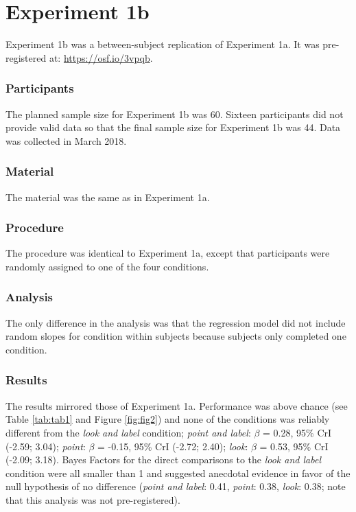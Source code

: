 \documentclass[
  man,floatsintext]{apa6}
\begin{document}
\section{Experiment 1b}\label{experiment-1b}

Experiment 1b was a between-subject replication of Experiment 1a. It was pre-registered at: \url{https://osf.io/3vpqb}.

\subsubsection{Participants}\label{participants-1}

The planned sample size for Experiment 1b was 60. Sixteen participants did not provide valid data so that the final sample size for Experiment 1b was 44. Data was collected in March 2018.

\subsubsection{Material}\label{material-1}

The material was the same as in Experiment 1a.

\subsubsection{Procedure}\label{procedure-1}

The procedure was identical to Experiment 1a, except that participants were randomly assigned to one of the four conditions.

\subsubsection{Analysis}\label{analysis-1}

The only difference in the analysis was that the regression model did not include random slopes for condition within subjects because subjects only completed one condition.

\subsubsection{Results}\label{results-1}

The results mirrored those of Experiment 1a. Performance was above chance (see Table \ref{tab:tab1} and Figure \ref{fig:fig2}) and none of the conditions was reliably different from the \emph{look and label} condition; \emph{point and label}: \(\beta\) = 0.28, 95\% CrI (-2.59; 3.04); \emph{point}: \(\beta\) = -0.15, 95\% CrI (-2.72; 2.40); \emph{look}: \(\beta\) = 0.53, 95\% CrI (-2.09; 3.18). Bayes Factors for the direct comparisons to the \emph{look and label} condition were all smaller than 1 and suggested anecdotal evidence in favor of the null hypothesis of no difference (\emph{point and label}: 0.41, \emph{point}: 0.38, \emph{look}: 0.38; note that this analysis was not pre-registered).
\end{document}
